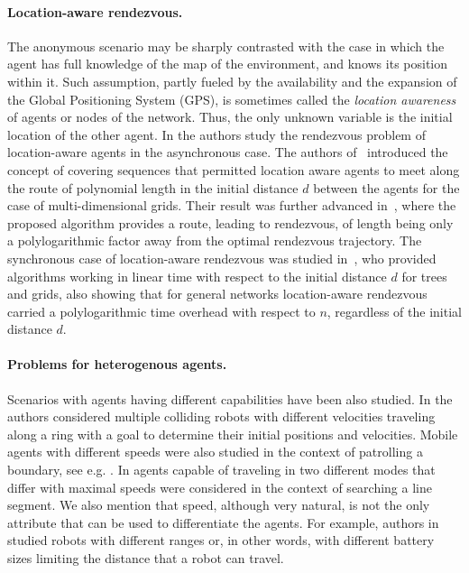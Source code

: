 \documentclass{llncs}
\begin{document}
\paragraph{Location-aware rendezvous.}
The anonymous scenario may be sharply contrasted with the case in which the agent has full knowledge of the map of the environment, and knows its position within it. Such assumption, partly fueled by the availability and the expansion of the Global Positioning System (GPS), is sometimes called the {\em location awareness} of agents or nodes of the network. Thus, the only unknown variable is the initial location of the other agent. In \cite{leszek-async,DISC10} the authors study the rendezvous problem of location-aware agents in the asynchronous case. The authors of~\cite{leszek-async} introduced the concept of covering sequences that permitted location aware agents to meet along the route of polynomial length in the initial distance $d$ between the agents for the case of multi-dimensional grids. Their result was further advanced in~\cite{DISC10}, where the proposed algorithm provides a route, leading to rendezvous, of length being only a polylogarithmic factor away from the optimal rendezvous trajectory. The synchronous case of location-aware rendezvous was studied in~\cite{CCGKM11}, who provided algorithms working in linear time with respect to the initial distance $d$ for trees and grids, also showing that for general networks location-aware rendezvous carried a polylogarithmic time overhead with respect to $n$, regardless of the initial distance $d$.

\paragraph{Problems for heterogenous agents.}
Scenarios with agents having different capabilities have been also studied.
In \cite{CzyzowiczKP13} the authors considered multiple colliding robots with different velocities traveling along a ring with a goal to determine their initial positions and velocities.
Mobile agents with different speeds were also studied in the context of patrolling a boundary, see e.g. \cite{CzyzowiczGKK11,KawamuraK12}.
In \cite{abs-1304-7693} agents capable of traveling in two different modes that differ with maximal speeds were considered in the context of searching a line segment.
We also mention that speed, although very natural, is not the only attribute that can be used to differentiate the agents.
For example, authors in \cite{Chalopin0MPW13} studied robots with different ranges or, in other words, with different battery sizes limiting the distance that a robot can travel.
\end{document}
